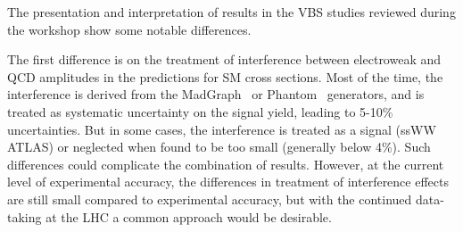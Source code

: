 The presentation and interpretation of results in the VBS studies reviewed during the workshop show some notable differences.




The first difference is on the treatment of interference between electroweak and QCD amplitudes in the predictions for SM cross sections. Most of the time, the interference is derived from the MadGraph~\cite{Alwall:2007fs} or Phantom~\cite{Ballestrero:2007xq} generators, and is treated as systematic uncertainty on the signal yield, leading to 5-10\% uncertainties. But in some cases, the interference is treated as a signal (ssWW ATLAS) or neglected when found to be too small (generally below 4\%). Such differences could complicate the combination of results.
However, at the current level of experimental accuracy, the differences in treatment of interference effects are still small compared to experimental accuracy, but with the continued data-taking at the LHC a common approach would be desirable.

